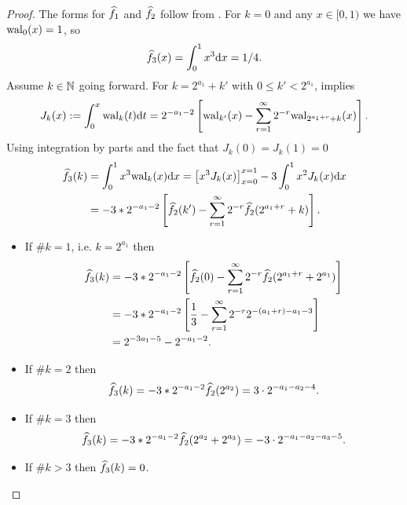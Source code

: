 \documentclass[acmsmall]{acmart}
\begin{document}
\begin{proof}
    The forms for ${\widehat{f}}_1$ and ${\widehat{f}}_2$ follow from \citep[Example 14.2, Example 14.3]{dick.digital_nets_sequences_book}. 
    For $k=0$ and any $x \in [0,1)$ we have $\mathrm{wal}_0(x) = 1$, so  
    $${\widehat{f}}_3(x) = \int_0^1 x^3 \mathrm{d} x = 1/4.$$ 
    Assume $k \in {\mathbb{N}}$ going forward. For $k=2^{a_1}+k'$ with $0 \leq k' < 2^{a_1}$, \citep[Equation 3.6]{fine.walsh_functions} implies
    $$J_k(x) := \int_0^x \mathrm{wal}_k(t) \mathrm{d} t = 2^{-a_1-2} \left[\mathrm{wal}_{k'}(x) - \sum_{r=1}^\infty 2^{-r} \mathrm{wal}_{2^{a_1+r}+k}(x)\right].$$
    Using integration by parts and the fact that $J_k(0) = J_k(1) = 0$
    \begin{align*}
        {\widehat{f}}_3(k) &= \int_0^1 x^3 \mathrm{wal}_k(x) \mathrm{d} x 
        = \left[x^3 J_k(x) \right]_{x=0}^{x=1} - 3 \int_0^1 x^2 J_k(x) \mathrm{d} x \\
        &= -3*2^{-a_1-2} \left[{\widehat{f}}_2(k') - \sum_{r=1}^\infty 2^{-r} {\widehat{f}}_2(2^{a_1+r}+k)\right].
    \end{align*}
    \begin{itemize}
        \item If $\#k=1$, i.e. $k=2^{a_1}$ then 
        \begin{align*}
            {\widehat{f}}_3(k) &= -3*2^{-a_1-2} \left[{\widehat{f}}_2(0) - \sum_{r=1}^\infty 2^{-r} {\widehat{f}}_2(2^{a_1+r}+2^{a_1})\right] \\
            &= -3*2^{-a_1-2} \left[\frac{1}{3} - \sum_{r=1}^\infty 2^{-r} 2^{-(a_1+r)-a_1-3}\right] \\
            &= 2^{-3a_1-5} - 2^{-a_1-2}.
        \end{align*}
        \item If $\#k=2$ then 
        $${\widehat{f}}_3(k) = -3*2^{-a_1-2} {\widehat{f}}_2(2^{a_2}) = 3 \cdot 2^{-a_1-a_2-4}.$$
        \item If $\#k=3$ then 
        $${\widehat{f}}_3(k) = -3*2^{-a_1-2} {\widehat{f}}_2(2^{a_2}+2^{a_3}) = -3 \cdot 2^{-a_1-a_2-a_3-5}.$$
        \item If $\#k>3$ then ${\widehat{f}}_3(k)=0$.
    \end{itemize}
\end{proof}
\end{document}
